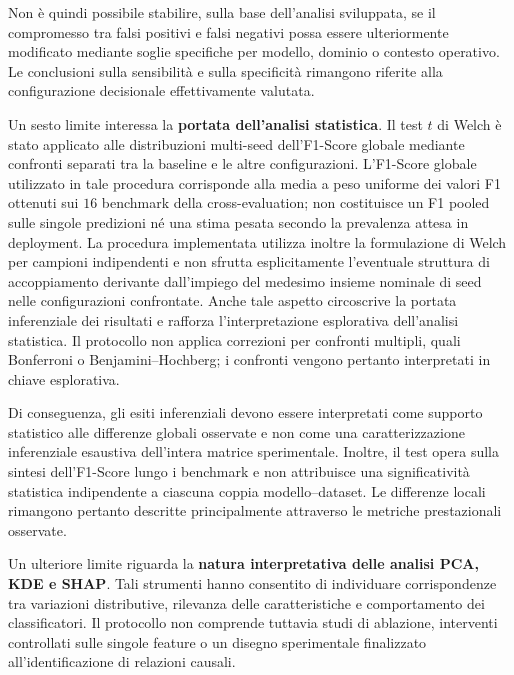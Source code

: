 Non è quindi possibile stabilire, sulla base dell'analisi sviluppata, se il compromesso tra falsi positivi e falsi negativi possa essere ulteriormente modificato mediante soglie specifiche per modello, dominio o contesto operativo.
Le conclusioni sulla sensibilità e sulla specificità rimangono riferite alla configurazione decisionale effettivamente valutata.

Un sesto limite interessa la \textbf{portata dell'analisi statistica}.
Il test $t$ di Welch è stato applicato alle distribuzioni multi-seed dell'F1-Score globale mediante confronti separati tra la baseline e le altre configurazioni.
L'F1-Score globale utilizzato in tale procedura corrisponde alla media a peso uniforme dei valori F1 ottenuti sui $16$ benchmark della cross-evaluation; non costituisce un F1 pooled sulle singole predizioni né una stima pesata secondo la prevalenza attesa in deployment.
La procedura implementata utilizza inoltre la formulazione di Welch per campioni indipendenti e non sfrutta esplicitamente l'eventuale struttura di accoppiamento derivante dall'impiego del medesimo insieme nominale di seed nelle configurazioni confrontate. Anche tale aspetto circoscrive la portata inferenziale dei risultati e rafforza l'interpretazione esplorativa dell'analisi statistica.
Il protocollo non applica correzioni per confronti multipli, quali Bonferroni o Benjamini--Hochberg; i confronti vengono pertanto interpretati in chiave esplorativa.

Di conseguenza, gli esiti inferenziali devono essere interpretati come supporto statistico alle differenze globali osservate e non come una caratterizzazione inferenziale esaustiva dell'intera matrice sperimentale.
Inoltre, il test opera sulla sintesi dell'F1-Score lungo i benchmark e non attribuisce una significatività statistica indipendente a ciascuna coppia modello--dataset.
Le differenze locali rimangono pertanto descritte principalmente attraverso le metriche prestazionali osservate.

Un ulteriore limite riguarda la \textbf{natura interpretativa delle analisi PCA, KDE e SHAP}.
Tali strumenti hanno consentito di individuare corrispondenze tra variazioni distributive, rilevanza delle caratteristiche e comportamento dei classificatori.
Il protocollo non comprende tuttavia studi di ablazione, interventi controllati sulle singole feature o un disegno sperimentale finalizzato all'identificazione di relazioni causali.

